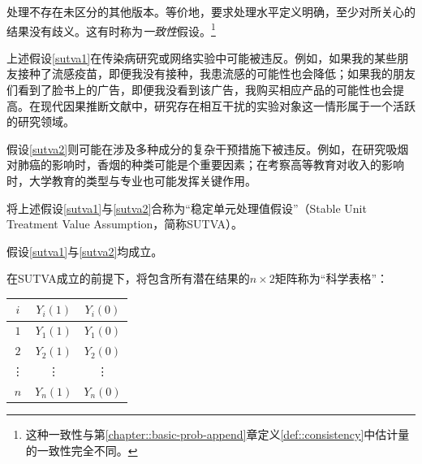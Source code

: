 \begin{assumption}
[一致性]
\label{sutva2}
处理不存在未区分的其他版本。等价地，要求处理水平定义明确，至少对所关心的结果没有歧义。这有时称为{\it 一致性}假设。\footnote{这种一致性与第\ref{chapter::basic-prob-append}章定义\ref{def::consistency}中估计量的一致性完全不同。} 
\end{assumption}


%
%

上述假设\ref{sutva1}在传染病研究或网络实验中可能被违反。例如，如果我的某些朋友接种了流感疫苗，即便我没有接种，我患流感的可能性也会降低；如果我的朋友们看到了脸书上的广告，即便我没看到该广告，我购买相应产品的可能性也会提高。在现代因果推断文献中，研究存在相互干扰的实验对象这一情形属于一个活跃的研究领域\citep[e.g.,][]{hudgens2008toward}。 


假设\ref{sutva2}则可能在涉及多种成分的复杂干预措施下被违反。例如，在研究吸烟对肺癌的影响时，香烟的种类可能是个重要因素；在考察高等教育对收入的影响时，大学教育的类型与专业也可能发挥关键作用。 


\citet{Rubin:1980}将上述假设\ref{sutva1}与\ref{sutva2}合称为“稳定单元处理值假设”（Stable Unit Treatment Value Assumption，简称SUTVA）。


\begin{assumption}
[SUTVA]
\label{sutva-complete}
假设\ref{sutva1}与\ref{sutva2}均成立。
\end{assumption}


在SUTVA成立的前提下，\citet{Rubin:2005}将包含所有潜在结果的$n\times 2$矩阵称为“科学表格”：
\begin{center}
\begin{tabular}{ccc}
\hline 
$i$ & $Y_i(1)$ &  $Y_i(0)$ \\
 \hline 
$1$ & $Y_1(1)$ &  $Y_1(0)$ \\
$2$ & $Y_2(1)$ &  $Y_2(0)$ \\
\vdots  &\vdots & \vdots   \\
$n$ & $Y_n(1)$ &  $Y_n(0)$ \\
\hline 
\end{tabular}
\end{center}  


